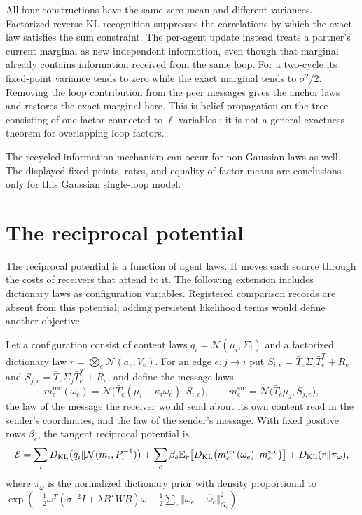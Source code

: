 \documentclass[11pt,letterpaper]{report}
\begin{document}
All four constructions have the same zero mean and different variances. Factorized reverse-KL recognition suppresses the correlations by which the exact law satisfies the sum constraint. The per-agent update instead treats a partner's current marginal as new independent information, even though that marginal already contains information received from the same loop. For a two-cycle its fixed-point variance tends to zero while the exact marginal tends to $\sigma^2/2$. Removing the loop contribution from the peer messages gives the anchor laws and restores the exact marginal here. This is belief propagation on the tree consisting of one factor connected to $\ell$ variables \citep{Pearl1988}; it is not a general exactness theorem for overlapping loop factors.

The recycled-information mechanism can occur for non-Gaussian laws as well. The displayed fixed points, rates, and equality of factor means are conclusions only for this Gaussian single-loop model.

\chapter{The reciprocal potential}
\label{it2:ch-reciprocal}

The reciprocal potential is a function of agent laws. It moves each source through the costs of receivers that attend to it. The following extension includes dictionary laws as configuration variables. Registered comparison records are absent from this potential; adding persistent likelihood terms would define another objective.

Let a configuration consist of content laws $q_i=\mathcal N(\mu_i,\Sigma_i)$ and a factorized dictionary law $r=\bigotimes_e\mathcal N(a_e,V_e)$. For an edge $e:j\to i$ put $S_{i,e}=\bar T_e\Sigma_i\bar T_e^T+R_e$ and $S_{j,e}=\bar T_e\Sigma_j\bar T_e^T+R_e$, and define the message laws
\begin{equation}
m_e^{\mathrm{rec}}(\omega_e)=\mathcal N\bigl(\bar T_e(\mu_i-\kappa_i\omega_e),S_{i,e}\bigr),\qquad
m_e^{\mathrm{src}}=\mathcal N\bigl(\bar T_e\mu_j,S_{j,e}\bigr),
\label{it2:message-laws}
\end{equation}
the law of the message the receiver would send about its own content read in the sender's coordinates, and the law of the sender's message. With fixed positive rows $\beta_e$, the tangent reciprocal potential is
\begin{equation}
\mathcal E=\sum_iD_{\mathrm{KL}}\bigl(q_i\Vert\mathcal N(m_i,P_i^{-1})\bigr)+\sum_e\beta_e\mathbb E_r\bigl[D_{\mathrm{KL}}\bigl(m_e^{\mathrm{rec}}(\omega_e)\Vert m_e^{\mathrm{src}}\bigr)\bigr]+D_{\mathrm{KL}}(r\Vert\pi_\omega),
\label{it2:potential-eq}
\end{equation}
where $\pi_\omega$ is the normalized dictionary prior with density proportional to $\exp(-\frac12\omega^T(\sigma^{-2}I+\lambda B^TWB)\omega-\frac12\sum_e\Vert\omega_e-\hat\omega_e\Vert_{G_e}^2)$.
\end{document}
